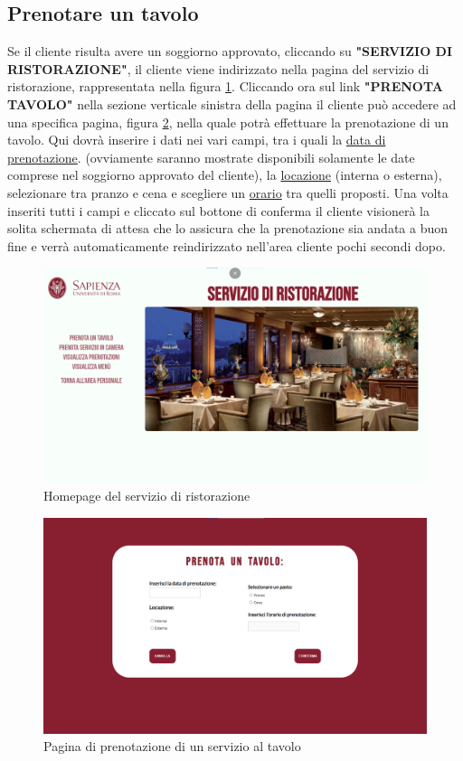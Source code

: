 \documentclass [a4paper, 12pt]{book}
\begin{document}
\subsection{Prenotare un tavolo}
Se il cliente risulta avere un soggiorno approvato, cliccando su \textbf{"SERVIZIO DI RISTORAZIONE"}, il cliente viene indirizzato nella pagina del servizio di ristorazione, rappresentata nella figura \ref{HomepageRistorante}. Cliccando ora sul link \textbf{"PRENOTA TAVOLO"} nella sezione verticale sinistra della pagina il cliente può accedere ad una specifica pagina, figura \ref{PrenotaTavolo}, nella quale potrà effettuare la prenotazione di un tavolo. Qui dovrà inserire i dati nei vari campi, tra i quali la \underline{data di prenotazione}. (ovviamente saranno mostrate disponibili solamente le date comprese nel soggiorno approvato del cliente), la \underline{locazione} (interna o esterna), selezionare tra pranzo e cena e scegliere un \underline{orario} tra quelli proposti. Una volta inseriti tutti i campi e cliccato sul bottone di conferma il cliente visionerà la solita schermata di attesa che lo assicura che la prenotazione sia andata a buon fine e verrà automaticamente reindirizzato nell'area cliente pochi secondi dopo. 
\begin{figure}[!h]
\centering
\includegraphics[scale=0.33]{HomepageRistorante.png}
\caption{Homepage del servizio di ristorazione}
\label{HomepageRistorante}
\end{figure}\newpage
\begin{figure}[!h]
\centering
\includegraphics[scale=0.3]{PrenotaTavolo.png}
\caption{Pagina di prenotazione di un servizio al tavolo}
\label{PrenotaTavolo}
\end{figure}
\end{document}
